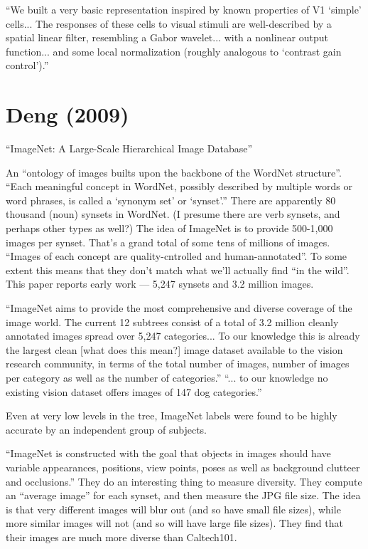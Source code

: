 \documentclass[12pt]{report}
\begin{document}
``We built a very basic representation inspired by known properties of
V1 `simple' cells... The responses of these cells to visual stimuli
are well-described by a spatial linear filter, resembling a Gabor
wavelet... with a nonlinear output function... and some local
normalization (roughly analogous to `contrast gain control').''

\section{Deng (2009)}

``ImageNet: A Large-Scale Hierarchical Image Database''

An ``ontology of images builts upon the backbone of the WordNet
structure''.  ``Each meaningful concept in WordNet, possibly described
by multiple words or word phrases, is called a `synonym set' or
`synset'.''  There are apparently 80 thousand (noun) synsets in
WordNet.  (I presume there are verb synsets, and perhaps other types
as well?)  The idea of ImageNet is to provide 500-1,000 images per
synset.  That's a grand total of some tens of millions of images.
``Images of each concept are quality-cntrolled and human-annotated''.
To some extent this means that they don't match what we'll actually
find ``in the wild''.  This paper reports early work --- 5,247 synsets
and 3.2 million images.

``ImageNet aims to provide the most comprehensive and diverse coverage
of the image world.  The current 12 subtrees consist of a total of 3.2
million cleanly annotated images spread over 5,247 categories... To
our knowledge this is already the largest clean [what does this mean?]
image dataset available to the vision research community, in terms of
the total number of images, number of images per category as well as
the number of categories.''  ``... to our knowledge no existing vision
dataset offers images of 147 dog categories.''

Even at very low levels in the tree, ImageNet labels were found to be
highly accurate by an independent group of subjects.

``ImageNet is constructed with the goal that objects in images should
have variable appearances, positions, view points, poses as well as
background clutteer and occlusions.''  They do an interesting thing to
measure diversity.  They compute an ``average image'' for each synset,
and then measure the JPG file size.  The idea is that very different
images will blur out (and so have small file sizes), while more
similar images will not (and so will have large file sizes).  They
find that their images are much more diverse than Caltech101.
\end{document}
